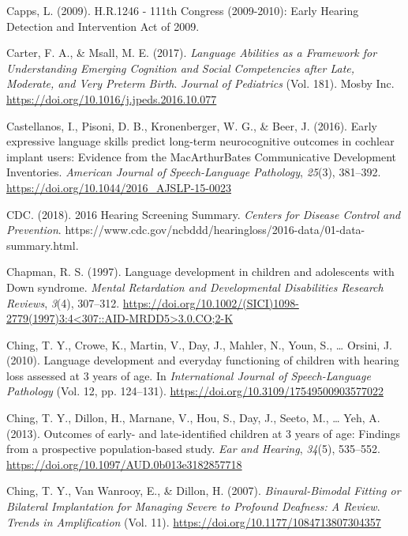 \documentclass[english,man]{apa6}
\begin{document}
\leavevmode\hypertarget{ref-capps2009}{}%
Capps, L. (2009). H.R.1246 - 111th Congress (2009-2010): Early Hearing Detection and Intervention Act of 2009.

\leavevmode\hypertarget{ref-carter2017}{}%
Carter, F. A., \& Msall, M. E. (2017). \emph{Language Abilities as a Framework for Understanding Emerging Cognition and Social Competencies after Late, Moderate, and Very Preterm Birth}. \emph{Journal of Pediatrics} (Vol. 181). Mosby Inc. \url{https://doi.org/10.1016/j.jpeds.2016.10.077}

\leavevmode\hypertarget{ref-castellanos2016}{}%
Castellanos, I., Pisoni, D. B., Kronenberger, W. G., \& Beer, J. (2016). Early expressive language skills predict long-term neurocognitive outcomes in cochlear implant users: Evidence from the MacArthurBates Communicative Development Inventories. \emph{American Journal of Speech-Language Pathology}, \emph{25}(3), 381--392. \url{https://doi.org/10.1044/2016_AJSLP-15-0023}

\leavevmode\hypertarget{ref-cdc2018}{}%
CDC. (2018). 2016 Hearing Screening Summary. \emph{Centers for Disease Control and Prevention}. https://www.cdc.gov/ncbddd/hearingloss/2016-data/01-data-summary.html.

\leavevmode\hypertarget{ref-chapman1997}{}%
Chapman, R. S. (1997). Language development in children and adolescents with Down syndrome. \emph{Mental Retardation and Developmental Disabilities Research Reviews}, \emph{3}(4), 307--312. \href{https://doi.org/10.1002/(SICI)1098-2779(1997)3:4\%3C307::AID-MRDD5\%3E3.0.CO;2-K}{https://doi.org/10.1002/(SICI)1098-2779(1997)3:4\textless{}307::AID-MRDD5\textgreater{}3.0.CO;2-K}

\leavevmode\hypertarget{ref-ching2010}{}%
Ching, T. Y., Crowe, K., Martin, V., Day, J., Mahler, N., Youn, S., \ldots{} Orsini, J. (2010). Language development and everyday functioning of children with hearing loss assessed at 3 years of age. In \emph{International Journal of Speech-Language Pathology} (Vol. 12, pp. 124--131). \url{https://doi.org/10.3109/17549500903577022}

\leavevmode\hypertarget{ref-ching2013}{}%
Ching, T. Y., Dillon, H., Marnane, V., Hou, S., Day, J., Seeto, M., \ldots{} Yeh, A. (2013). Outcomes of early- and late-identified children at 3 years of age: Findings from a prospective population-based study. \emph{Ear and Hearing}, \emph{34}(5), 535--552. \url{https://doi.org/10.1097/AUD.0b013e3182857718}

\leavevmode\hypertarget{ref-ching2007}{}%
Ching, T. Y., Van Wanrooy, E., \& Dillon, H. (2007). \emph{Binaural-Bimodal Fitting or Bilateral Implantation for Managing Severe to Profound Deafness: A Review}. \emph{Trends in Amplification} (Vol. 11). \url{https://doi.org/10.1177/1084713807304357}
\end{document}
